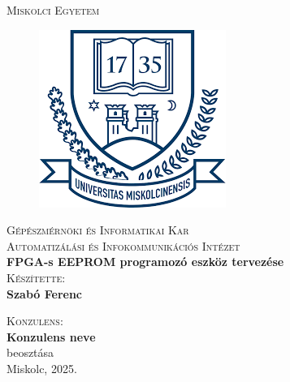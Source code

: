 \documentclass[a4paper,12pt,oneside]{book}
\newcommand{\nev}{Szabó Ferenc}
\newcommand{\cim}{FPGA-s EEPROM programozó eszköz tervezése}
\begin{document}
\thispagestyle{empty}

\begin{center}
		\textsc{\Large{Miskolci Egyetem}}
	
	\begin{figure}[H]
		\centering
		\includegraphics[scale=0.5]{misk_egy.png}
	\end{figure}
	
	\textsc{\Large{Gépészmérnöki és Informatikai Kar}}\\	
	\vspace{5mm}	
	\textsc{\Large{Automatizálási és Infokommunikációs Intézet}}\\
	
	\vspace{14mm}	
	\textbf{\Large{\cim}}\\
	
	\vspace{10mm}
	\textsc{Készítette:}\\
	\textbf{\nev}\\
	\vspace{20mm}
	
	\vspace{5mm}
	\textsc{Konzulens:}\\
	\textbf{Konzulens neve}\\
	beosztása\\
	
	\vspace{35mm} Miskolc, 2025.	
	
\end{center}
\thispagestyle{empty}
\clearpage
\end{document}
